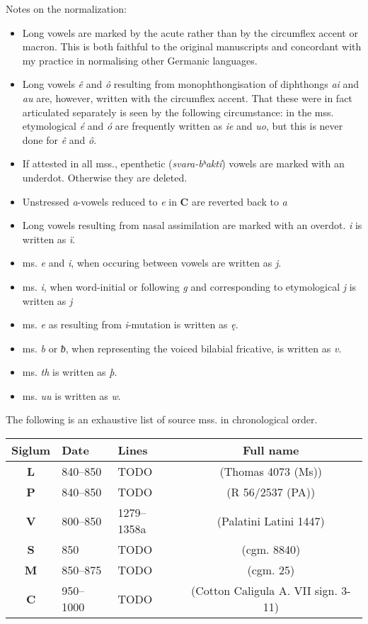 Notes on the normalization:
  \begin{itemize}
    \item Long vowels are marked by the acute rather than by the circumflex accent or macron. This is both faithful to the original manuscripts and concordant with my practice in normalising other Germanic languages.
    \item Long vowels \emph{ê} and \emph{ô} resulting from monophthongisation of diphthongs \emph{ai} and \emph{au} are, however, written with the circumflex accent. That these were in fact articulated separately is seen by the following circumstance: in the mss. etymological \emph{é} and \emph{ó} are frequently written as \emph{ie} and \emph{uo}, but this is never done for \emph{ê} and \emph{ô}.
    \item If attested in all mss., epenthetic (\emph{svara-bʰaktí}) vowels are marked with an underdot. Otherwise they are deleted.
    \item Unstressed \emph{a}-vowels reduced to \emph{e} in \textbf{C} are reverted back to \emph{a}
    \item Long vowels resulting from nasal assimilation are marked with an overdot. \emph{i} is written as \emph{ï}.
    \item ms. \emph{e} and \emph{i}, when occuring between vowels are written as \emph{j}.
    \item ms. \emph{i}, when word-initial or following \emph{g} and corresponding to etymological \emph{j} is written as \emph{j}
    \item ms. \emph{e} as resulting from \emph{i}-mutation is written as \emph{ę}.
    \item ms. \emph{b} or \emph{ƀ}, when representing the voiced bilabial fricative, is written as \emph{v}.
    \item ms. \emph{th} is written as \emph{þ}.
    \item ms. \emph{uu} is written as \emph{w}.
  \end{itemize}

The following is an exhaustive list of source mss. in chronological order.

\begin{longtabu} to \textwidth {|c l l c|}
	\hline
	Siglum & Date & Lines & Full name \\
	\hline\hline\endhead
  \textbf{L} & 840–850 & TODO & (Thomas 4073 (Ms)) \\
  \textbf{P} & 840–850 & TODO & (R 56/2537 (PA)) \\
  \textbf{V} & 800–850 & 1279–1358a & (Palatini Latini 1447) \\
  \textbf{S} & 850 & TODO & (cgm. 8840) \\
  \textbf{M} & 850–875 & TODO & (cgm. 25) \\
  \textbf{C} & 950–1000 & TODO & (Cotton Caligula A. VII sign. 3-11) \\
	\hline
\end{longtabu}

